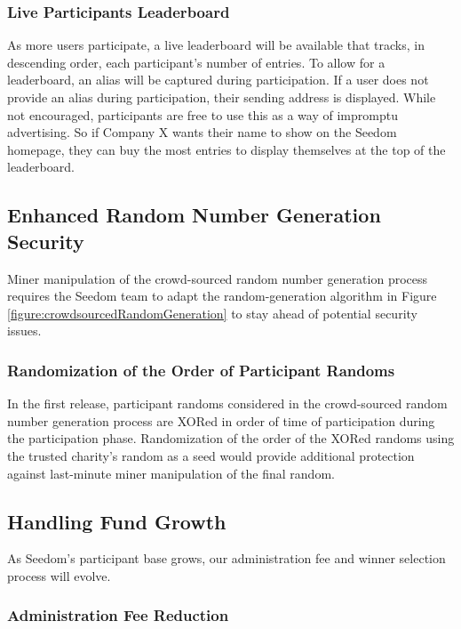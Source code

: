 \documentclass[11pt]{article}
\begin{document}
\subsubsection{Live Participants Leaderboard}

As more users participate, a live leaderboard will be available that tracks, in descending order, each participant's number of entries. To allow for a leaderboard, an alias will be captured during participation. If a user does not provide an alias during participation, their sending address is displayed. While not encouraged, participants are free to use this as a way of impromptu advertising. So if Company X wants their name to show on the Seedom homepage, they can buy the most entries to display themselves at the top of the leaderboard.

\subsection{Enhanced Random Number Generation Security}

Miner manipulation of the crowd-sourced random number generation process requires the Seedom team to adapt the random-generation algorithm in Figure \ref{figure:crowdsourcedRandomGeneration} to stay ahead of potential security issues.

\subsubsection{Randomization of the Order of Participant Randoms}

In the first release, participant randoms considered in the crowd-sourced random number generation process are XORed in order of time of participation during the participation phase. Randomization of the order of the XORed randoms using the trusted charity's random as a seed would provide additional protection against last-minute miner manipulation of the final random.

\subsection{Handling Fund Growth}

As Seedom's participant base grows, our administration fee and winner selection process will evolve.

\subsubsection{Administration Fee Reduction}
\end{document}
